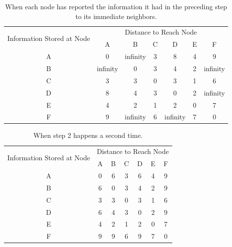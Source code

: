 \documentclass{article}
\begin{document}
\begin{table}[hbt!]
\caption{When each node has reported the information it had in the preceding step to its
immediate neighbors.}
\centering
\begin{tabular}{|c|c|c|c|c|c|c|} 
\hline
\multirow{2}{*}{Information Stored at Node} & \multicolumn{6}{c|}{Distance to Reach Node}        \\ 
\cline{2-7}
                                           & A        & B        & C & D        & E & F         \\ 
\hline
A                                          & 0        & infinity & 3 & 8        & 4 & 9         \\ 
\hline
B                                          & infinity & 0        & 3 & 4        & 2 & infinity  \\ 
\hline
C                                          & 3        & 3        & 0 & 3        & 1 & 6         \\ 
\hline
D                                          & 8        & 4        & 3 & 0        & 2 & infinity  \\ 
\hline
E                                          & 4        & 2        & 1 & 2        & 0 & 7         \\ 
\hline
F                                          & 9        & infinity & 6 & infinity & 7 & 0         \\
\hline
\end{tabular}

\end{table}



\begin{table}[hbt!]
\caption{When step 2 happens a second time.}
\centering
\begin{tabular}{|c|c|c|c|c|c|c|} 
\hline
\multirow{2}{*}{Information Stored at Node} & \multicolumn{6}{c|}{Distance to Reach Node}  \\ 
\cline{2-7}
                                           & A & B & C & D & E & F                        \\ 
\hline
A                                          & 0 & 6 & 3 & 6 & 4 & 9                        \\ 
\hline
B                                          & 6 & 0 & 3 & 4 & 2 & 9                        \\ 
\hline
C                                          & 3 & 3 & 0 & 3 & 1 & 6                        \\ 
\hline
D                                          & 6 & 4 & 3 & 0 & 2 & 9                        \\ 
\hline
E                                          & 4 & 2 & 1 & 2 & 0 & 7                        \\ 
\hline
F                                          & 9 & 9 & 6 & 9 & 7 & 0                        \\
\hline
\end{tabular}

\end{table}
\pagebreak{}
\end{document}

